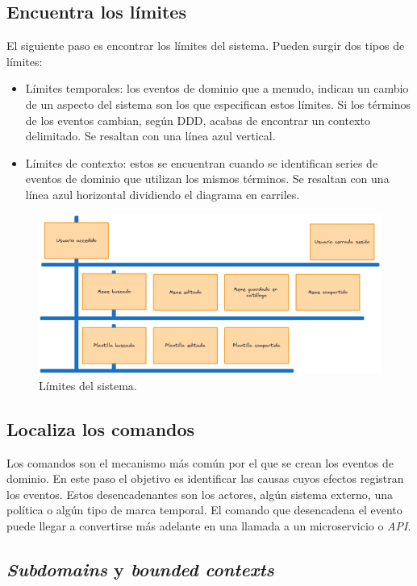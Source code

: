 \subsection{Encuentra los límites}

El siguiente paso es encontrar los límites del sistema. Pueden surgir dos tipos de límites:

\begin{itemize}
    \item Límites temporales: los eventos de dominio que a menudo, indican un cambio de un aspecto del sistema son los que especifican estos límites. Si los términos de los eventos cambian, según DDD, acabas de encontrar un contexto delimitado. Se resaltan con una línea azul vertical.
    \item Límites de contexto: estos se encuentran cuando se identifican series de eventos de dominio que utilizan los mismos términos. Se resaltan con una línea azul horizontal dividiendo el diagrama en carriles.
\end{itemize}

\begin{figure}[ht]
    \caption{Límites del sistema.}
    \centering
    \vspace*{0.5cm}
    \includegraphics[scale=0.15]{figuras/limites.png}
\end{figure}

\subsection{Localiza los comandos}

Los comandos son el mecanismo más común por el que se crean los eventos de dominio. En este paso el objetivo es identificar las causas cuyos efectos registran los eventos. Estos desencadenantes son los actores, algún sistema externo, una política o algún tipo de marca temporal. El comando que desencadena el evento puede llegar a convertirse más adelante en una llamada a un microservicio o \textit{API}. 



\subsection{\textit{Subdomains} y \textit{bounded contexts}}



